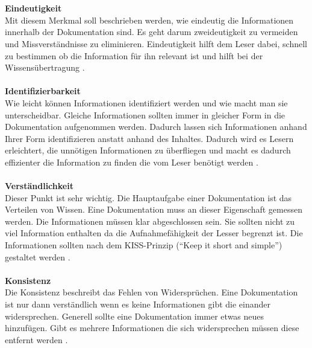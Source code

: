 \documentclass[a4paper,12pt]{scrartcl}
\begin{document}
\\\\
\textbf{Eindeutigkeit}\\
Mit diesem Merkmal soll beschrieben werden, wie eindeutig die Informationen innerhalb der Dokumentation sind. Es geht darum zweideutigkeit zu vermeiden und Missverständnisse zu eliminieren. Eindeutigkeit hilft dem Leser dabei, schnell zu bestimmen ob die Information für ihn relevant ist und hilft bei der Wissensübertragung \cite{Prause2013}.
\\\\
\textbf{Identifizierbarkeit}\\
Wie leicht können Informationen identifiziert werden und wie macht man sie unterscheidbar. Gleiche Informationen sollten immer in gleicher Form in die Dokumentation aufgenommen werden. Dadurch lassen sich Informationen anhand Ihrer Form identifizieren anstatt anhand des Inhaltes. Dadurch wird es Lesern erleichtert, die unnötigen Informationen zu überfliegen und macht es dadurch effizienter die Information zu finden die vom Leser benötigt werden \cite{Prause2013}.
\\\\
\textbf{Verständlichkeit}\\
Dieser Punkt ist sehr wichtig. Die Hauptaufgabe einer Dokumentation ist das Verteilen von Wissen. Eine Dokumentation muss an dieser Eigenschaft gemessen werden. Die Informationen müssen klar abgeschlossen sein. Sie sollten nicht zu viel Information enthalten da die Aufnahmefähigkeit der Lesser begrenzt ist. Die Informationen sollten nach dem KISS-Prinzip (“Keep it short and simple”) gestaltet werden \cite{Prause2013}.
\\\\
\textbf{Konsistenz}\\
Die Konsistenz beschreibt das Fehlen von Widersprüchen. Eine Dokumentation ist nur dann verständlich wenn es keine Informationen gibt die einander widersprechen. Generell sollte eine Dokumentation immer etwas neues hinzufügen. Gibt es mehrere Informationen die sich widersprechen müssen diese entfernt werden \cite{Prause2013}.
\end{document}
